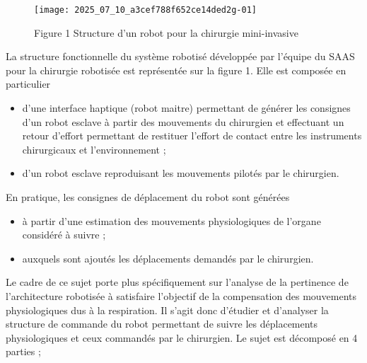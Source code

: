 \begin{figure}[!h]
\texttt{[image: 2025\_07\_10\_a3cef788f652ce14ded2g-01]}
\centering

Figure 1 Structure d'un robot pour la chirurgie mini-invasive\\
\end{figure}

La structure fonctionnelle du système robotisé développée par l'équipe du SAAS pour la chirurgie robotisée est représentée sur la figure 1. Elle est composée en particulier

\begin{itemize}
  \item d'une interface haptique (robot maitre) permettant de générer les consignes d'un robot esclave à partir des mouvements du chirurgien et effectuant un retour d'effort permettant de restituer l'effort de contact entre les instruments chirurgicaux et l'environnement ;
  \item d'un robot esclave reproduisant les mouvements pilotés par le chirurgien.
\end{itemize}

En pratique, les consignes de déplacement du robot sont générées

\begin{itemize}
  \item à partir d'une estimation des mouvements physiologiques de l'organe considéré à suivre ;
  \item auxquels sont ajoutés les déplacements demandés par le chirurgien.
\end{itemize}

Le cadre de ce sujet porte plus spécifiquement sur l'analyse de la pertinence de l'architecture robotisée à satisfaire l'objectif de la compensation des mouvements physiologiques dus à la respiration. Il s'agit donc d'étudier et d'analyser la structure de commande du robot permettant de suivre les déplacements physiologiques et ceux commandés par le chirurgien. Le sujet est décomposé en 4 parties ;

